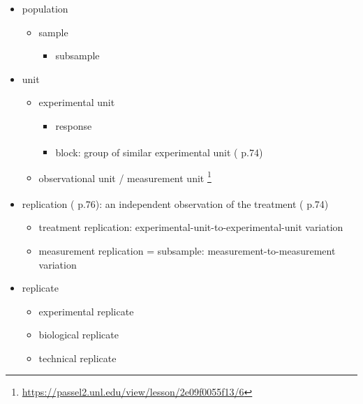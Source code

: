 \documentclass[
]{book}
\providecommand{\tightlist}{%
  \setlength{\itemsep}{0pt}\setlength{\parskip}{0pt}}
\theoremstyle{definition}
\theoremstyle{definition}
\theoremstyle{definition}
\theoremstyle{definition}
\theoremstyle{remark}
\begin{document}
\begin{itemize}
\tightlist
\item
  population

  \begin{itemize}
  \tightlist
  \item
    sample

    \begin{itemize}
    \tightlist
    \item
      subsample
    \end{itemize}
  \end{itemize}
\item
  unit

  \begin{itemize}
  \tightlist
  \item
    experimental unit

    \begin{itemize}
    \tightlist
    \item
      response
    \item
      block: group of similar experimental unit (\textsuperscript{} p.74)
    \end{itemize}
  \item
    observational unit / measurement unit \footnote{\url{https://passel2.unl.edu/view/lesson/2e09f0055f13/6}}
  \end{itemize}
\item
  replication (\textsuperscript{} p.76): an independent observation of the treatment (\textsuperscript{} p.74)

  \begin{itemize}
  \tightlist
  \item
    treatment replication: experimental-unit-to-experimental-unit variation
  \item
    measurement replication = subsample: measurement-to-measurement variation
  \end{itemize}
\item
  replicate

  \begin{itemize}
  \tightlist
  \item
    experimental replicate
  \item
    biological replicate
  \item
    technical replicate
  \end{itemize}
\end{itemize}
\end{document}
